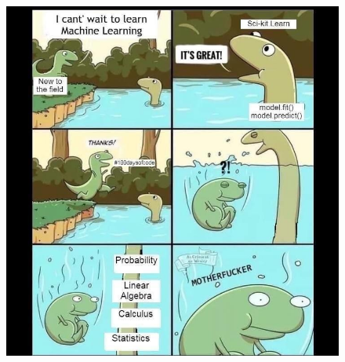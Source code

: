 \documentclass[
  shownotes,
  xcolor={svgnames},
  hyperref={colorlinks,citecolor=DarkBlue,linkcolor=andesred,urlcolor=DarkBlue}
  , aspectratio=169]{beamer}
\begin{document}
\begin{frame}
\begin{minipage}[t]{0.58\linewidth}
\begin{itemize}
        \end{itemize}
    \end{minipage}
    \hfill
    \begin{minipage}[t]{0.38\linewidth}%
        \begin{figure}[H] \centering
            \captionsetup{justification=centering}  
            \includegraphics[scale=0.2]{figures/ml_trick}
    \end{figure}
    \end{minipage}

\end{frame}


\end{document}
